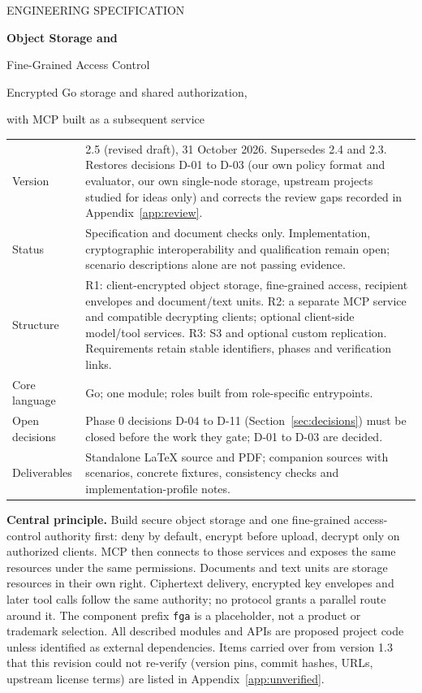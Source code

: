 \documentclass[11pt,a4paper]{article}
\begin{document}
\begin{titlepage}
\vspace*{15mm}
{\color{accent}\large ENGINEERING SPECIFICATION\par}
\vspace{8mm}
{\color{ink}\Huge\bfseries Object Storage and\par Fine-Grained Access Control\par}
\vspace{7mm}
{\LARGE Encrypted Go storage and shared authorization,\par with MCP built as a subsequent service\par}
\vspace{15mm}
\begin{tabularx}{\textwidth}{@{}P{34mm}Y@{}}
\toprule
Version & 2.5 (revised draft), 31 October 2026. Supersedes 2.4 and 2.3. Restores decisions D-01 to D-03 (our own policy format and evaluator, our own single-node storage, upstream projects studied for ideas only) and corrects the review gaps recorded in Appendix~\ref{app:review}.\\
Status & Specification and document checks only. Implementation, cryptographic interoperability and qualification remain open; scenario descriptions alone are not passing evidence.\\
Structure & R1: client-encrypted object storage, fine-grained access, recipient envelopes and document/text units. R2: a separate MCP service and compatible decrypting clients; optional client-side model/tool services. R3: S3 and optional custom replication. Requirements retain stable identifiers, phases and verification links.\\
Core language & Go; one module; roles built from role-specific entrypoints.\\
Open decisions & Phase 0 decisions D-04 to D-11 (Section~\ref{sec:decisions}) must be closed before the work they gate; D-01 to D-03 are decided.\\
Deliverables & Standalone LaTeX source and PDF; companion sources with scenarios, concrete fixtures, consistency checks and implementation-profile notes.\\
\bottomrule
\end{tabularx}\par
\vspace{8mm}
\textbf{Central principle.} Build secure object storage and one fine-grained access-control authority first: deny by default, encrypt before upload, decrypt only on authorized clients. MCP then connects to those services and exposes the same resources under the same permissions. Documents and text units are storage resources in their own right. Ciphertext delivery, encrypted key envelopes and later tool calls follow the same authority; no protocol grants a parallel route around it.
\vfill
The component prefix \texttt{fga} is a placeholder, not a product or trademark selection. All described modules and APIs are proposed project code unless identified as external dependencies. Items carried over from version 1.3 that this revision could not re-verify (version pins, commit hashes, URLs, upstream license terms) are listed in Appendix~\ref{app:unverified}.
\end{titlepage}
\end{document}
